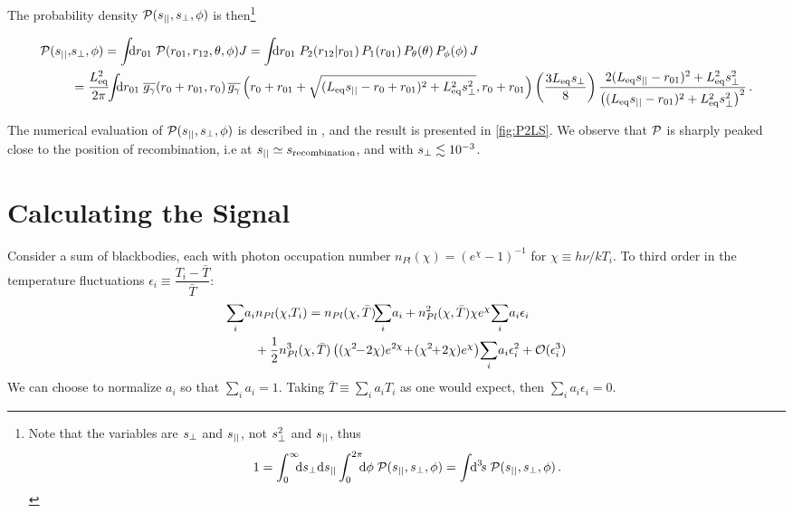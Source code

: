 \documentclass[fleqn,usenatbib]{mnras}
\begin{document}
    The probability density $\mathcal{P}(s_{||},s_{\perp},\phi)$ is then\footnote{%
        Note that the variables are $s_{\perp}$ and $s_{||}$, not $s_{\perp}^2$ and
        $s_{||}$, thus
        \begin{equation} \label{eq:Pnormalization}
            1 = \int_0^{\infty}\!\!\!\dif{\sprp} \dif{\spll} \int_0^{2\pi}\!\!\!\dif{\phi} \; \mcal{P}(\spll,\sprp,\phi)
              = \int\!\!\dif[3]{s}\; \mcal{P}(\spll,\sprp,\phi) \,. \nonumber
        \end{equation}
    }

    \begin{widetext}
    \begin{align} \label{eq:Pspllsprpphi}
        \mcal{P}(\spll,&\sprp,\phi)
            = \int\!\!\!\dif{r_{01}} \; \mcal{P}(r_{01},r_{12},\theta,\phi) J 
             = \int\!\!\!\dif{r_{01}} \; P_2(r_{12}|r_{01}) \, P_1(r_{01}) \, P_\theta(\theta) \, P_\phi(\phi) \, J
            \\
            &= \frac{\Leq^2}{2\pi} \!\!
               \int\!\!\!\dif{r_{01}} \;
                \GgamBar(r_0+r_{01},r_0) \,
                \GgamBar\left( r_0+r_{01}+\sqrt{(\Leq \spll-r_0+r_{01})^2+\Leq^2\sprp^2}, r_0+r_{01} \right)
                \left( \frac{3\Leq \sprp}{8} \right)
                \frac{2(\Leq \spll-r_{01})^2 + \Leq^2\sprp^2}
                    {\left((\Leq \spll-r_{01})^2+\Leq^2\sprp^2\right)^2} \,.
    \end{align}
    \end{widetext}

    The numerical evaluation of $\mathcal{P}(s_{||},s_{\perp},\phi)$ is described in
    , and the result is presented in \autoref{fig:P2LS}.
    We observe that $\mathcal{P}$ is sharply peaked close to the position of
    recombination, i.e at $s_{||} \simeq s_{\rm recombination}$, and with $s_{\perp} \lesssim
    10^{-3}$.



\section{Calculating the Signal} \label{sec:calculating_the_signal}

    Consider a sum of blackbodies, each with photon occupation number
    $n_{Pl}(\chi)=(e^\chi-1)^{-1}$ for $\chi\equiv h\nu/kT_i$.  To third order
    in the temperature fluctuations $\epsilon_i \equiv
    \dfrac{T_i-\bar{T}}{\bar{T}}$:
    \begin{align} \label{eqn:sumofbb}
        \sum_i & a_i n_{Pl}(\chi,\!T_i)
            =   n_{Pl}(\chi,\bar{T}) \!\! \sum_i\!a_i
              + n_{Pl}^2(\chi,\bar{T}) \chi e^\chi \! \sum_i \! a_i \epsilon_i 
            \\ & \phantom{=}
              + \frac{1}{2} n_{Pl}^3(\chi,\bar{T}) \left((\chi^2\!\!-\!2\chi) \Exp{2\chi} \!+\! (\chi^2 \!\!+\! 2\chi)e^\chi\right) \!\sum_i\!a_i\epsilon_i^2
              + \mcal{O}(\epsilon_i^3)  \nonumber
    \end{align}
    We can choose to normalize $a_i$ so that $\sum_i a_i=1$.  Taking
    $\bar{T}\equiv\sum_i a_i T_i$ as one would expect, then $\sum_i
    a_i\epsilon_i=0$.
\end{document}
